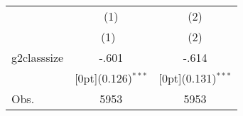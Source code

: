 \begin{tabular*}{\textwidth}{@{\extracolsep{\fill}}lcc}		
	& \multicolumn{1}{c}{(1)} &	\multicolumn{1}{c}{(2)} \\
\cline{2-3}		
	& \multicolumn{1}{c}{(1)\mbox{\ }} &	\multicolumn{1}{c}{(2)} \\
\hline		
g2classsize &	-.601 &	-.614 \\
&	\raisebox{.7ex}[0pt]{\scriptsize (0.126)$^{***}$} &	\raisebox{.7ex}[0pt]{\scriptsize (0.131)$^{***}$} \\
Obs. &	5953 &	5953 \\
\hline\hline		
\end{tabular*}%
